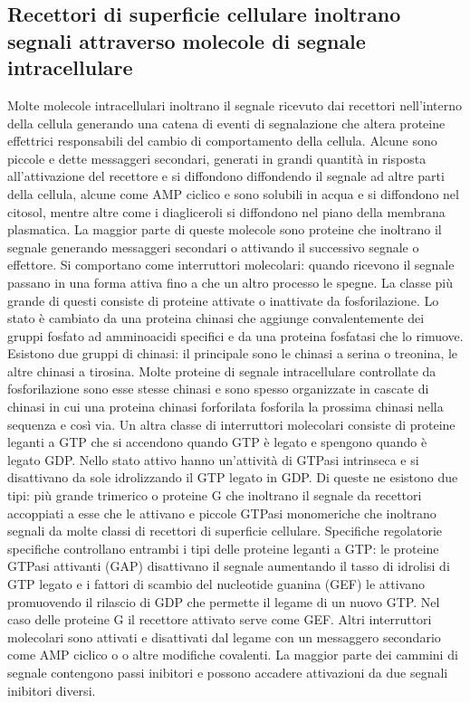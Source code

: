 \subsection{Recettori di superficie cellulare inoltrano segnali attraverso molecole di segnale intracellulare}
Molte molecole intracellulari inoltrano il segnale ricevuto dai recettori nell'interno della cellula generando una catena di eventi di segnalazione che altera proteine effettrici 
responsabili del cambio di comportamento della cellula. Alcune sono piccole e dette messaggeri secondari, generati in grandi quantit\`a in risposta all'attivazione del recettore e 
si diffondono diffondendo il segnale ad altre parti della cellula, alcune come AMP ciclico e  sono solubili in acqua e si diffondono nel citosol, mentre altre come i 
diagliceroli si diffondono nel piano della membrana plasmatica. La maggior parte di queste molecole sono proteine che inoltrano il segnale generando messaggeri secondari o attivando
il successivo segnale o effettore. Si comportano come interruttori molecolari: quando ricevono il segnale passano in una forma attiva fino a che un altro processo le spegne. La classe 
pi\`u grande di questi consiste di proteine attivate o inattivate da fosforilazione. Lo stato \`e cambiato da una proteina chinasi che aggiunge convalentemente dei gruppi fosfato ad
amminoacidi specifici e da una proteina fosfatasi che lo rimuove. Esistono due gruppi di chinasi: il principale sono le chinasi a serina o treonina, le altre chinasi a tirosina. Molte
proteine di segnale intracellulare controllate da fosforilazione sono esse stesse chinasi e sono spesso organizzate in cascate di chinasi in cui una proteina chinasi forforilata 
fosforila la prossima chinasi nella sequenza e cos\`i via. Un altra classe di interruttori molecolari consiste di proteine leganti a GTP che si accendono quando GTP \`e legato e 
spengono quando \`e legato GDP. Nello stato attivo hanno un'attivit\`a di GTPasi intrinseca e si disattivano da sole idrolizzando il GTP legato in GDP. Di queste ne esistono due tipi:
pi\`u grande trimerico o proteine G che inoltrano il segnale da recettori accoppiati a esse che le attivano e piccole GTPasi monomeriche che inoltrano segnali da molte classi di 
recettori di superficie cellulare. Specifiche regolatorie specifiche controllano entrambi i tipi delle proteine leganti a GTP: le proteine GTPasi attivanti (GAP) disattivano il segnale
aumentando il tasso di idrolisi di GTP legato e i fattori di scambio del nucleotide guanina (GEF) le attivano promuovendo il rilascio di GDP che permette il legame di un nuovo GTP. Nel
caso delle proteine G il recettore attivato serve come GEF. Altri interruttori molecolari sono attivati e disattivati dal legame con un messaggero secondario come AMP ciclico o 
 o altre modifiche covalenti. La maggior parte dei cammini di segnale contengono passi inibitori e possono accadere attivazioni da due segnali inibitori diversi. 
